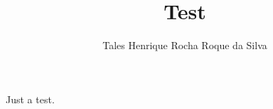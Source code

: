 \documentclass[a4paper,12pt]{article}
\title{Test}
\author{Tales Henrique Rocha Roque da Silva}
\begin{document}
\maketitle

 Just a test.
\end{document}
